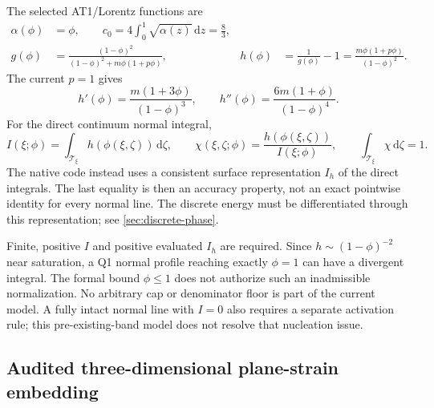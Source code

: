 \documentclass[11pt,a4paper]{article}
\newcommand{\dd}{\,\mathrm d}
\begin{document}
The selected AT1/Lorentz functions are
\begin{align}
 \alpha(\phi)&=\phi,\qquad c_0=4\int_0^1\sqrt{\alpha(z)}\dd z=\frac83,\\
 g(\phi)&=\frac{(1-\phi)^2}{(1-\phi)^2+m\phi(1+p\phi)},
 &h(\phi)&=\frac1{g(\phi)}-1
 =\frac{m\phi(1+p\phi)}{(1-\phi)^2}.
 \label{eq:g-h}
\end{align}
The current $p=1$ gives
\begin{equation}
 h'(\phi)=\frac{m(1+3\phi)}{(1-\phi)^3},\qquad
 h''(\phi)=\frac{6m(1+\phi)}{(1-\phi)^4}.
 \label{eq:h-derivatives}
\end{equation}
For the direct continuum normal integral,
\begin{equation}
 I(\xi;\phi)=\int_{\mathcal T_\xi}h(\phi(\xi,\zeta))\dd\zeta,
 \qquad \chi(\xi,\zeta;\phi)=\frac{h(\phi(\xi,\zeta))}{I(\xi;\phi)},
 \qquad \int_{\mathcal T_\xi}\chi\dd\zeta=1.
 \label{eq:normalization}
\end{equation}
The native code instead uses a consistent surface representation $I_h$ of the
direct integrals. The last equality is then an accuracy property, not an exact
pointwise identity for every normal line. The discrete energy must be differentiated
through this representation; see \cref{sec:discrete-phase}.

Finite, positive $I$ and positive evaluated $I_h$ are required. Since
$h\sim(1-\phi)^{-2}$ near saturation, a Q1 normal profile reaching exactly
$\phi=1$ can have a divergent integral. The formal bound $\phi\leq1$ does not
authorize such an inadmissible normalization. No arbitrary cap or denominator
floor is part of the current model. A fully intact normal line with $I=0$ also
requires a separate activation rule; this pre-existing-band model does not
resolve that nucleation issue.

\subsection{Audited three-dimensional plane-strain embedding}
\label{sec:plane-strain}
\end{document}
